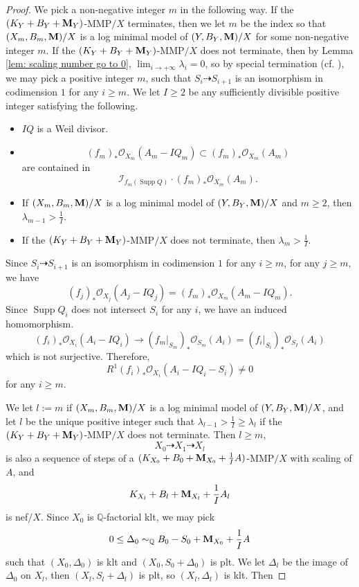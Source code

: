 \documentclass[11pt]{amsart}
\numberwithin{equation}{section}
\newcommand{\Mm}{{\bf{M}}}
\newcommand{\Qq}{\mathbb{Q}}
\newcommand{\Supp}{\operatorname{Supp}}
\theoremstyle{definition}
\theoremstyle{definition}
\theoremstyle{definition}
\begin{document}
\begin{proof}
We pick a non-negative integer $m$ in the following way. If the $(K_Y+B_Y+\Mm_Y)$-MMP$/X$ terminates, then we let $m$ be the index so that $(X_m,B_m,\Mm)/X$ is a log minimal model of $(Y,B_Y,\Mm)/X$ for some non-negative integer $m$. If the $(K_Y+B_Y+\Mm_Y)$-MMP$/X$ does not terminate, then by Lemma \ref{lem: scaling number go to 0}, $\lim_{i\rightarrow+\infty}\lambda_i=0$, so by special termination (cf. \cite[Lemma 2.18]{LX23a}), we may pick a positive integer $m$, such that $S_i\dashrightarrow S_{i+1}$ is an isomorphism in codimension $1$ for any $i\geq m$. We let $I\geq 2$ be any sufficiently divisible positive integer satisfying the following.
\begin{itemize}
    \item $IQ$ is a Weil divisor.
    \item 
    $$(f_m)_*\mathcal{O}_{X_m}(A_m-IQ_m)\subset (f_m)_*\mathcal{O}_{X_m}(A_m)$$
    are contained in 
    $$\mathcal{I}_{f_m(\Supp Q)}\cdot (f_m)_*\mathcal{O}_{X_m}(A_m).$$
    \item If $(X_m,B_m,\Mm)/X$ is a log minimal model of $(Y,B_Y,\Mm)/X$ and $m\geq 2$, then $\lambda_{m-1}>\frac{1}{I}$.
    \item If the $(K_Y+B_Y+\Mm_Y)$-MMP$/X$ does not terminate, then $\lambda_m>\frac{1}{I}$.
\end{itemize}
Since $S_i\dashrightarrow S_{i+1}$ is an isomorphism in codimension $1$ for any $i\geq m$, for any $j\geq m$, we have
$$(f_j)_*\mathcal{O}_{X_j}(A_j-IQ_j)=(f_m)_*\mathcal{O}_{X_m}(A_m-IQ_m).$$
Since $\Supp Q_i$ does not intersect $S_i$ for any $i$, we  have an induced homomorphism. 
$$(f_i)_*\mathcal{O}_{X_i}(A_i-IQ_i)\rightarrow(f_m|_{S_m})_*\mathcal{O}_{S_m}(A_i)=(f_i|_{S_i})_*\mathcal{O}_{S_I}(A_i)$$
which is not surjective. Therefore,
$$R^1(f_i)_*\mathcal{O}_{X_i}(A_i-IQ_i-S_i)\not=0$$
for any $i\geq m$. 

We let $l:=m$ if $(X_m,B_m,\Mm)/X$ is a log minimal model of $(Y,B_Y,\Mm)/X$, and let $l$ be the unique positive integer such that $\lambda_{l-1}>\frac{1}{I}\geq\lambda_{l}$ if the $(K_Y+B_Y+\Mm_Y)$-MMP$/X$ does not terminate. Then $l\geq m$,
$$X_0\dashrightarrow X_1\dashrightarrow X_{l}$$
is also a sequence of steps of a $(K_{X_0}+B_0+\Mm_{X_0}+\frac{1}{I}A)$-MMP$/X$ with scaling of $A$, and $$K_{X_{l}}+B_{l}+\Mm_{X_{l}}+\frac{1}{I}A_{l}$$ 
is nef$/X$. Since $X_0$ is $\Qq$-factorial klt, we may pick $$0\leq \Delta_0\sim_{\mathbb Q}B_0-S_0+\Mm_{X_0}+\frac{1}{I}A$$ such that $(X_0,\Delta_0)$ is klt and $(X_0,S_0+\Delta_0)$ is plt. We let $\Delta_l$ be the image of $\Delta_0$ on $X_l$, then $(X_l,S_l+\Delta_l)$ is plt, so $(X_l,\Delta_l)$ is klt. Then


\end{proof}
\end{document}
